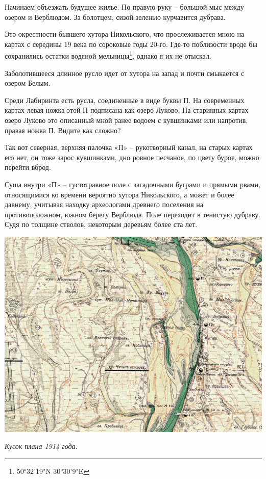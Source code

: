 Начинаем объезжать будущее жилье. По правую руку – большой мыс между озером и Верблюдом. За болотцем, сизой зеленью курчавится дубрава.

Это окрестности бывшего хутора Никольского, что прослеживается мною на картах с середины 19 века по сороковые годы 20-го. Где-то поблизости вроде бы сохранились остатки водяной мельницы\footnote{50°32'19"N 30°30'9"E}, однако я их не отыскал.

Заболотившееся длинное русло идет от хутора на запад и почти смыкается с озером Белым.

Среди Лабиринта есть русла, соединенные в виде буквы П. На современных картах левая ножка этой П подписана как озеро Луково. На старинных картах озеро Луково это описанный мной ранее водоем с кувшинками или напротив, правая ножка П. Видите как сложно?

Так вот северная, верхняя палочка «П» – рукотворный канал, на старых картах его нет, он тоже зарос кувшинками, дно ровное песчаное, по цвету бурое, можно перейти вброд.

Суша внутри «П» – густотравное поле с загадочными буграми и прямыми рвами, относящимися ко времени вероятно хутора Никольского, а может и более давнему, учитывая находку археологами древнего поселения на противоположном, южном берегу Верблюда. Поле переходит в тенистую дубраву. Судя по толщине стволов, некоторым деревьям более ста лет.



\begin{center}
\includegraphics[width=\linewidth]{chast-colebanie-osnov/pochayna/itsunsrc.jpg}

\textit{Кусок плана 1914 года.}
\end{center}










